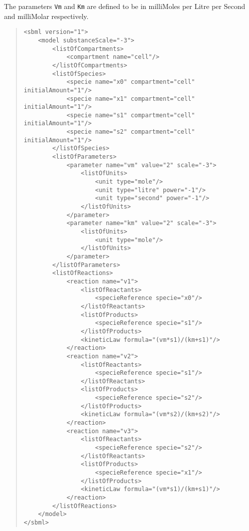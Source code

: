 \documentclass[10pt]{cek-article}
\begin{document}
The parameters \texttt{Vm} and \texttt{Km} are defined to be in milliMoles
per Litre per Second and milliMolar respectively.

\begin{quote}
\begin{small}
\tightspacing
\begin{verbatim}
<sbml version="1">
    <model substanceScale="-3">
        <listOfCompartments>
            <compartment name="cell"/>
        </listOfCompartments>
        <listOfSpecies>
            <specie name="x0" compartment="cell" initialAmount="1"/>
            <specie name="x1" compartment="cell" initialAmount="1"/>
            <specie name="s1" compartment="cell" initialAmount="1"/>
            <specie name="s2" compartment="cell" initialAmount="1"/>
        </listOfSpecies>
        <listOfParameters>
            <parameter name="vm" value="2" scale="-3">
                <listOfUnits>
                    <unit type="mole"/>
                    <unit type="litre" power="-1"/>
                    <unit type="second" power="-1"/>
                </listOfUnits>
            </parameter>
            <parameter name="km" value="2" scale="-3">
                <listOfUnits>
                    <unit type="mole"/>
                </listOfUnits>
            </parameter>
        </listOfParameters>
        <listOfReactions>
            <reaction name="v1">
                <listOfReactants>
                    <specieReference specie="x0"/>
                </listOfReactants>
                <listOfProducts>
                    <specieReference specie="s1"/>
                </listOfProducts>
                <kineticLaw formula="(vm*s1)/(km+s1)"/>
            </reaction>
            <reaction name="v2">
                <listOfReactants>
                    <specieReference specie="s1"/>
                </listOfReactants>
                <listOfProducts>
                    <specieReference specie="s2"/>
                </listOfProducts>
                <kineticLaw formula="(vm*s2)/(km+s2)"/>
            </reaction>
            <reaction name="v3">
                <listOfReactants>
                    <specieReference specie="s2"/>
                </listOfReactants>
                <listOfProducts>
                    <specieReference specie="x1"/>
                </listOfProducts>
                <kineticLaw formula="(vm*s1)/(km+s1)"/>
            </reaction>
        </listOfReactions>
    </model>
</sbml>
\end{verbatim}
  \regularspacing
\end{small}
\end{quote}
\end{document}
